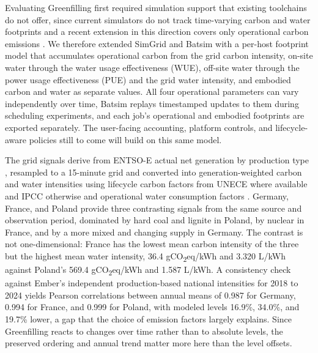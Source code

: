 Evaluating Greenfilling first required simulation support that existing toolchains do not offer, since current simulators do not track time-varying carbon and water footprints and a recent extension in this direction covers only operational carbon emissions \parencite{saraiva2025Estimating}. We therefore extended SimGrid \parencite{casanova2025Lowering} and Batsim \parencite{dutot2017Batsim} with a per-host footprint model that accumulates operational carbon from the grid carbon intensity, on-site water through the water usage effectiveness (WUE), off-site water through the power usage effectiveness (PUE) and the grid water intensity, and embodied carbon and water as separate values. All four operational parameters can vary independently over time, Batsim replays timestamped updates to them during scheduling experiments, and each job's operational and embodied footprints are exported separately. The user-facing accounting, platform controls, and lifecycle-aware policies still to come will build on this same model.

The grid signals derive from ENTSO-E actual net generation by production type \parencite{hirth2018ENTSOE}, resampled to a 15-minute grid and converted into generation-weighted carbon and water intensities using lifecycle carbon factors from UNECE where available and IPCC otherwise \parencite{unitednations2022Carbon, intergovernmentalpanelonclimatechange2015Climate} and operational water consumption factors \parencite{macknick2012Operational}. Germany, France, and Poland provide three contrasting signals from the same source and observation period, dominated by hard coal and lignite in Poland, by nuclear in France, and by a more mixed and changing supply in Germany. The contrast is not one-dimensional: France has the lowest mean carbon intensity of the three but the highest mean water intensity, 36.4 gCO\textsubscript{2}eq/kWh and 3.320 L/kWh against Poland's 569.4 gCO\textsubscript{2}eq/kWh and 1.587 L/kWh. A consistency check against Ember's independent production-based national intensities for 2018 to 2024 yields Pearson correlations between annual means of 0.987 for Germany, 0.994 for France, and 0.999 for Poland, with modeled levels 16.9\%, 34.0\%, and 19.7\% lower, a gap that the choice of emission factors largely explains. Since Greenfilling reacts to changes over time rather than to absolute levels, the preserved ordering and annual trend matter more here than the level offsets.

